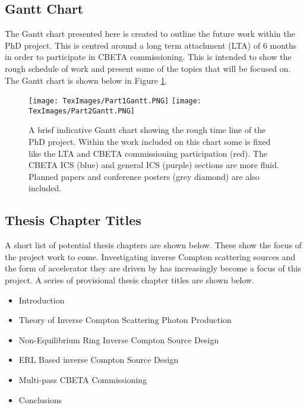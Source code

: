 \documentclass[11pt]{article}
\begin{document}
\subsection{Gantt Chart}

The Gantt chart presented here is created to outline the future work within the PhD project. This is centred around a long term attachment (LTA) of 6 months in order to participate in CBETA commissioning. This is intended to show the rough schedule of work and present some of the topics that will be focused on. The Gantt chart is shown below in Figure \ref{fig:Gantt}.

\begin{figure}[H]
\centering
\texttt{[image: TexImages/Part1Gantt.PNG]}
\texttt{[image: TexImages/Part2Gantt.PNG]}
\caption{\label{fig:Gantt} A brief indicative Gantt chart showing the rough time line of the PhD project. Within the work included on this chart some is fixed like the LTA and CBETA commissioning participation (red). The CBETA ICS (blue) and general ICS (purple) sections are more fluid. Planned papers and conference posters (grey diamond) are also included.}
\end{figure}
  
\subsection{Thesis Chapter Titles}

A short list of potential thesis chapters are shown below. These show the focus of the project work to come. Investigating inverse Compton scattering sources and the form of accelerator they are driven by has increasingly become a focus of this project. A series of provisional thesis chapter titles are shown below. 

\begin{itemize}
\item{Introduction}
\item{Theory of Inverse Compton Scattering Photon Production}
\item{Non-Equilibrium Ring Inverse Compton Source Design}
\item{ERL Based inverse Compton Source Design}
\item{Multi-pass CBETA Commissioning}
\item{Conclusions}
\end{itemize} 

\newpage


\end{document}
